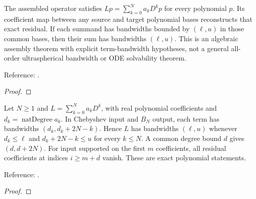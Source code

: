 \begin{theorem}
\label{thm:polynomial-differential-operator}
\leanok
The assembled operator satisfies $Lp=\sum_{k=0}^Na_kD^kp$ for every polynomial
$p$. Its coefficient map between any source and target polynomial bases
reconstructs that exact residual. If each summand has bandwidths bounded by
$(\ell,u)$ in those common bases, then their sum has bandwidths $(\ell,u)$.
This is an algebraic assembly theorem with explicit term-bandwidth hypotheses,
not a general all-order ultraspherical bandwidth or ODE solvability theorem.

Reference: \cite[Section 3]{olver-townsend}.
\end{theorem}
\begin{proof}
\leanok
\end{proof}

\begin{theorem}
\label{thm:all-order-ultraspherical}
\leanok
Let $N\ge1$ and $L=\sum_{k=0}^N a_kD^k$, with real polynomial coefficients and
$d_k=\operatorname{natDegree}a_k$. In Chebyshev input and $B_N$ output,
each term has bandwidths $(d_k,d_k+2N-k)$. Hence $L$ has bandwidths $(\ell,u)$
whenever $d_k\le\ell$ and $d_k+2N-k\le u$ for every $k\le N$.
A common degree bound $d$ gives $(d,d+2N)$. For input supported on the first $m$
coefficients, all residual coefficients at indices $i\ge m+d$ vanish.
These are exact polynomial statements.

Reference: \cite[Section 3]{olver-townsend}.
\end{theorem}
\begin{proof}
\leanok
\end{proof}

